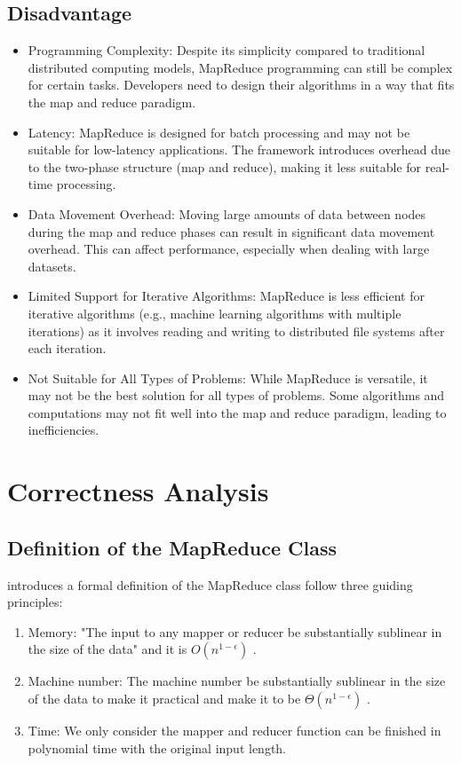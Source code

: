\documentclass{article}
\begin{document}
\subsection{Disadvantage}
\begin{itemize}
      \item Programming Complexity:
      Despite its simplicity compared to traditional distributed computing models, MapReduce programming can still be complex for certain tasks. Developers need to design their algorithms in a way that fits the map and reduce paradigm.
      \item Latency:
      MapReduce is designed for batch processing and may not be suitable for low-latency applications. The framework introduces overhead due to the two-phase structure (map and reduce), making it less suitable for real-time processing.
      \item Data Movement Overhead:
      Moving large amounts of data between nodes during the map and reduce phases can result in significant data movement overhead. This can affect performance, especially when dealing with large datasets.
      \item Limited Support for Iterative Algorithms:
      MapReduce is less efficient for iterative algorithms (e.g., machine learning algorithms with multiple iterations) as it involves reading and writing to distributed file systems after each iteration.
      \item Not Suitable for All Types of Problems:
      While MapReduce is versatile, it may not be the best solution for all types of problems. Some algorithms and computations may not fit well into the map and reduce paradigm, leading to inefficiencies.
\end{itemize}

\section{Correctness Analysis}
\subsection{Definition of the MapReduce Class}
      \cite{model} introduces a formal definition of the MapReduce class follow three guiding principles:
      \begin{enumerate}
            \item Memory: "The input to any mapper or reducer be substantially sublinear in the size of the data" \cite{model} and it is $O(n^{1-\epsilon})$ .
            \item Machine number: The machine number be substantially sublinear in the size of the data to make it practical and make it to be $\Theta(n^{1-\epsilon})$ .
            \item Time: We only consider the mapper and reducer function can be finished in polynomial time with the original input length.
      \end{enumerate}
\end{document}
